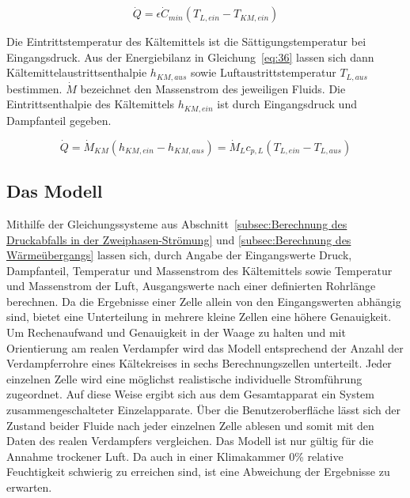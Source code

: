 \begin{equation}
\label{eq:35}
\dot{Q} = \epsilon \dot{C}_{min} (T_{L,ein} - T_{KM,ein})
\end{equation}

Die Eintrittstemperatur des Kältemittels ist die Sättigungstemperatur bei Eingangsdruck. Aus der Energiebilanz in Gleichung~\ref{eq:36} lassen sich dann Kältemittelaustrittsenthalpie $h_{KM,aus}$ sowie Luftaustrittstemperatur $T_{L,aus}$ bestimmen. $\dot{M}$ bezeichnet den Massenstrom des jeweiligen Fluids. Die Eintrittsenthalpie des Kältemittels $h_{KM,ein}$ ist durch Eingangsdruck und Dampfanteil gegeben.

\begin{equation}
\label{eq:36}
\dot{Q} = \dot{M}_{KM} (h_{KM,ein} - h_{KM,aus}) = \dot{M}_{L} c_{p,L}(T_{L,ein} - T_{L,aus})
\end{equation}




\subsection{Das Modell}
\label{subsec:Das Modell}

Mithilfe der Gleichungssysteme aus Abschnitt~\ref{subsec:Berechnung des Druckabfalls in der Zweiphasen-Strömung} und \ref{subsec:Berechnung des Wärmeübergangs} lassen sich, durch Angabe der Eingangswerte Druck, Dampfanteil, Temperatur und Massenstrom des Kältemittels sowie Temperatur und Massenstrom der Luft, Ausgangswerte nach einer definierten Rohrlänge berechnen. Da die Ergebnisse einer Zelle allein von den Eingangswerten abhängig sind, bietet eine Unterteilung in mehrere kleine Zellen eine höhere Genauigkeit. Um Rechenaufwand und Genauigkeit in der Waage zu halten und mit Orientierung am realen Verdampfer wird das Modell entsprechend der Anzahl der Verdampferrohre eines Kältekreises in sechs Berechnungszellen unterteilt\cite{LehrstuhlfurWarmeundStoffubertragung.b}. Jeder einzelnen Zelle wird eine möglichst realistische individuelle Stromführung zugeordnet. Auf diese Weise ergibt sich aus dem Gesamtapparat ein System zusammengeschalteter Einzelapparate\cite{SpringerVerlagGmbH.2013}.
Über die Benutzeroberfläche lässt sich der Zustand beider Fluide nach jeder einzelnen Zelle ablesen und somit mit den Daten des realen Verdampfers vergleichen.
Das Modell ist nur gültig für die Annahme trockener Luft. Da auch in einer Klimakammer \unit{0}{\%} relative Feuchtigkeit schwierig zu erreichen sind, ist eine Abweichung der Ergebnisse zu erwarten.


